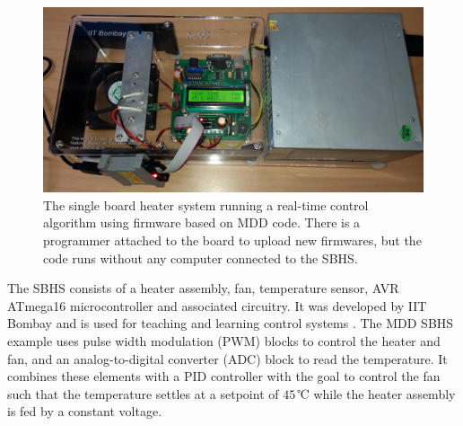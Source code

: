 \documentclass{resources/modelica}
\begin{document}
\begin{figure}[htb]
  \centering
  \includegraphics[width=0.9\columnwidth]{figures/SBHS.jpg}
  \caption{The single board heater system running a real-time control algorithm using firmware based on MDD code. There is a programmer attached to the board to upload new firmwares, but the code runs without any computer connected to the SBHS.}
  \label{fig:sbhs}
\end{figure}

\noindent
The SBHS consists of a heater assembly, fan, temperature sensor, AVR ATmega16 microcontroller and associated circuitry.
It was developed by IIT Bombay and is used for teaching and learning control systems \cite{Arora2010}.
The MDD SBHS example uses pulse width modulation (PWM) blocks to control the
heater and fan, and an analog-to-digital converter (ADC) block to read the
temperature. It combines these elements with a PID controller with the goal to
control the fan such that the temperature settles at a setpoint of $45\,$℃
while the heater assembly is fed by a constant voltage.
\end{document}
